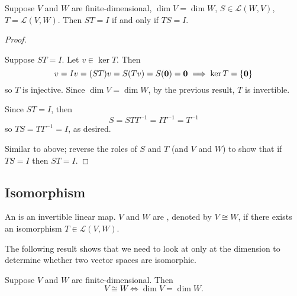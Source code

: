 \begin{corollary}
Suppose $V$ and $W$ are finite-dimensional, $\dim V=\dim W$, $S\in\mathcal{L}(W,V)$, $T=\mathcal{L}(V,W)$. Then $ST=I$ if and only if $TS=I$.
\end{corollary}

\begin{proof} \

\fbox{$\implies$} Suppose $ST=I$. Let $v\in\ker T$. Then
\[v=Iv=(ST)v=S(Tv)=S(\vb{0})=\vb{0}\implies \ker T=\{\vb{0}\}\]
so $T$ is injective. Since $\dim V=\dim W$, by the previous result, $T$ is invertible.

Since $ST=I$, then
\[S=STT^{-1}=IT^{-1}=T^{-1}\]
so $TS=TT^{-1}=I$, as desired.

\fbox{$\impliedby$} Similar to above; reverse the roles of $S$ and $T$ (and $V$ and $W$) to show that if $TS=I$ then $ST=I$.
\end{proof}

\subsection{Isomorphism}
\begin{definition}[Isomorphism]
An  is an invertible linear map. $V$ and $W$ are , denoted by $V\cong W$, if there exists an isomorphism $T\in\mathcal{L}(V,W)$.
\end{definition}

The following result shows that we need to look at only at the dimension to determine whether two vector spaces are isomorphic.

\begin{lemma}
Suppose $V$ and $W$ are finite-dimensional. Then
\[V\cong W\iff\dim V=\dim W.\]
\end{lemma}

